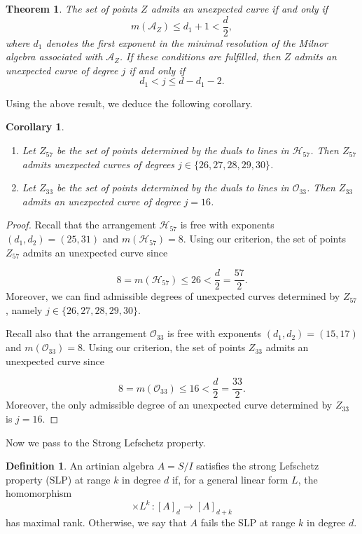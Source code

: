 \documentclass[11pt]{article}
\theoremstyle{plain}
\newtheorem{theorem}[thm]{Theorem}
\newtheorem{corollary}[thm]{Corollary}
\theoremstyle{definition}
\newtheorem{definition}[thm]{Definition}
\theoremstyle{plain}
\renewcommand\leq{\leqslant}
\begin{document}
\begin{theorem}
The set of points $Z$ admits an unexpected curve if and only if 
$$m(\mathcal{A}_{Z}) \leq d_{1} +1 < \frac{d}{2},$$
where $d_{1}$ denotes the first exponent in the minimal resolution of the Milnor algebra associated with $\mathcal{A}_{Z}$. If these conditions are fulfilled, then $Z$ admits an unexpected curve of degree $j$ if and only if
$$d_{1} < j \leq d - d_{1}-2.$$
\end{theorem}
Using the above result, we deduce the following corollary.
\begin{corollary}
\begin{enumerate}
\item[a)] Let $Z_{57}$ be the set of points determined by the duals to lines in $\mathcal{H}_{57}$. Then $Z_{57}$ admits unexpected curves of degrees $j \in \{26, 27, 28, 29, 30\}$.
\item[b)] Let $Z_{33}$ be the set of points determined by the duals to lines in $\mathcal{O}_{33}$. Then $Z_{33}$ admits an unexpected curve of degree $j=16$.
\end{enumerate}
\end{corollary}
\begin{proof}
Recall that the arrangement $\mathcal{H}_{57}$ is free with exponents $(d_{1},d_{2}) = (25,31)$ and $m(\mathcal{H}_{57}) = 8$. Using our criterion, the set of points $Z_{57}$ admits an unexpected curve since

$$8=m(\mathcal{H}_{57}) \leq 26 < \frac{d}{2}= \frac{57}{2}.$$
Moreover, we can find admissible degrees of unexpected curves determined by $Z_{57}$, namely $j \in \{26, 27, 28, 29, 30\}$.

Recall also that the arrangement $\mathcal{O}_{33}$ is free with exponents $(d_{1},d_{2}) = (15,17)$ and $m(\mathcal{O}_{33}) = 8$. Using our criterion, the set of points $Z_{33}$ admits an unexpected curve since

$$8 = m(\mathcal{O}_{33}) \leq 16 < \frac{d}{2} = \frac{33}{2} .$$
Moreover, the only admissible degree of an unexpected curve determined by $Z_{33}$ is $j = 16$.
\end{proof}

Now we pass to the Strong Lefschetz property.
\begin{definition}
An artinian algebra $A = S/I$ satisfies the strong Lefschetz property (SLP) at range $k$ in degree $d$ if, for a general linear form $L$, the homomorphism 
$$\times L^{k} \, : [A]_{d} \rightarrow [A]_{d+k}$$
has maximal rank. Otherwise, we say that $A$ fails the SLP at range $k$ in degree $d$.
\end{definition}
\end{document}
